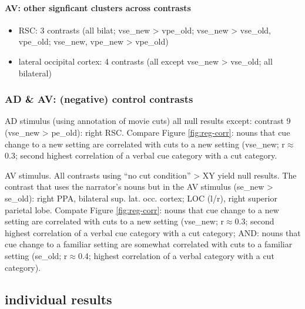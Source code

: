 \documentclass[english]{article}
\begin{document}
\paragraph{AV: other signficant clusters across contrasts}

\begin{itemize}
    \item RSC: 3 contrasts (all bilat; vse\_new > vpe\_old; vse\_new >
        vse\_old, vpe\_old; vse\_new, vpe\_new > vpe\_old)
    \item lateral occipital cortex: 4 contrasts (all except vse\_new > vse\_old; all bilateral)
\end{itemize}


\subsubsection{AD \& AV: (negative) control contrasts}


AD stimulus (using annotation of movie cuts) all null results except: contrast 9
(vse\_new > pe\_old): right RSC.
Compare Figure \ref{fig:reg-corr}: nouns that cue change to a new setting are
correlated  with cuts to a new setting (vse\_new; r$\approx$0.3; second highest
correlation of a verbal cue category with a cut category.

AV stimulus. All contrasts using ``no cut condition'' > XY yield null results.
The contrast that uses the narrator's nouns but in the AV stimulus (se\_new >
se\_old): right PPA, bilateral sup. lat. occ. cortex; LOC (l/r), right superior
parietal lobe. Compate Figure \ref{fig:reg-corr}: nouns that cue change to a new
setting are correlated  with cuts to a new setting (vse\_new; r$\approx$0.3;
second highest correlation of a verbal cue category with a cut category; AND:
nouns that cue change to a familiar setting are somewhat correlated with cuts to
a familiar setting (se\_old; r$\approx$0.4; highest correlation of a verbal
category with a cut category).


\subsection{individual results}

\end{document}
